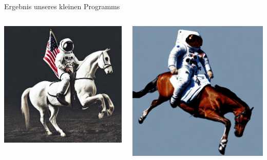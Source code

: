 \begin{frame}{Ergebnis unseres kleinen Programms}
    \begin{columns}
        \includegraphics[width=\textwidth]{img/ai-gallery1}

        \includegraphics[width=\textwidth]{img/ai-gallery2}
    \end{columns}


\end{frame}
